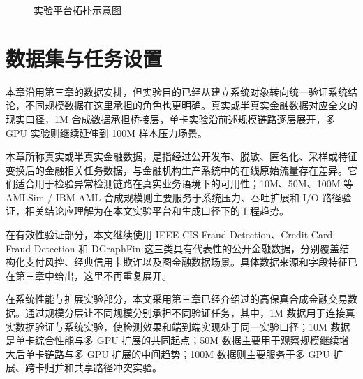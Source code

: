 \begin{figure}[!htbp]
{%
  }
  \caption{实验平台拓扑示意图}
  \label{fig:exp-topology}
\end{figure}

\section{数据集与任务设置}

本章沿用第三章的数据安排，但实验目的已经从建立系统对象转向统一验证系统结论，不同规模数据在这里承担的角色也更明确。真实或半真实金融数据对应全文的现实口径，1M 合成数据承担桥接层，单卡实验沿前述规模链路逐层展开，多 GPU 实验则继续延伸到 100M 样本压力场景。

本章所称真实或半真实金融数据，是指经过公开发布、脱敏、匿名化、采样或特征变换后的金融相关任务数据，与金融机构生产系统中的在线原始流量存在差异。它们适合用于检验异常检测链路在真实业务语境下的可用性；10M、50M、100M 等 AMLSim / IBM AML 合成规模则主要服务于系统压力、吞吐扩展和 I/O 路径验证，相关结论应理解为在本文实验平台和生成口径下的工程趋势。

在有效性验证部分，本文继续使用 IEEE-CIS Fraud Detection、Credit Card Fraud Detection 和 DGraphFin 这三类具有代表性的公开金融数据，分别覆盖结构化支付风控、经典信用卡欺诈以及图金融数据场景。具体数据来源和字段特征已在第三章中给出，这里不再重复展开。

在系统性能与扩展实验部分，本文采用第三章已经介绍过的高保真合成金融交易数据。通过规模分层让不同规模分别承担不同验证任务，其中，1M 数据用于连接真实数据验证与系统实验，使检测效果和端到端实现处于同一实验口径；10M 数据是单卡综合性能与多 GPU 扩展的共同起点；50M 数据主要用于观察规模继续增大后单卡链路与多 GPU 扩展的中间趋势；100M 数据则主要服务于多 GPU 扩展、跨卡归并和共享路径冲突实验。

